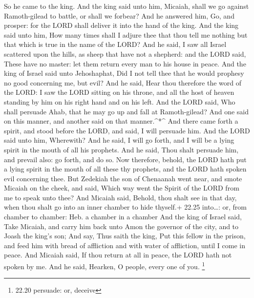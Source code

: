  So he came to the king. And the king said unto him,
Micaiah, shall we go against Ramoth-gilead to battle, or shall we
forbear? And he answered him, Go, and prosper: for the LORD shall
deliver it into the hand of the king.  And the king said
unto him, How many times shall I adjure thee that thou tell me nothing
but that which is true in the name of the LORD?  And he
said, I saw all Israel scattered upon the hills, as sheep that have not
a shepherd: and the LORD said, These have no master: let them return
every man to his house in peace.  And the king of Israel
said unto Jehoshaphat, Did I not tell thee that he would prophesy no
good concerning me, but evil?  And he said, Hear thou
therefore the word of the LORD: I saw the LORD sitting on his throne,
and all the host of heaven standing by him on his right hand and on his
left.  And the LORD said, Who shall persuade Ahab, that he
may go up and fall at Ramoth-gilead? And one said on this manner, and
another said on that manner.\^{}*\^{}  And there came forth
a spirit, and stood before the LORD, and said, I will persuade him.
 And the LORD said unto him, Wherewith? And he said, I will
go forth, and I will be a lying spirit in the mouth of all his prophets.
And he said, Thou shalt persuade him, and prevail also: go forth, and do
so.  Now therefore, behold, the LORD hath put a lying
spirit in the mouth of all these thy prophets, and the LORD hath spoken
evil concerning thee.  But Zedekiah the son of Chenaanah
went near, and smote Micaiah on the cheek, and said, Which way went the
Spirit of the LORD from me to speak unto thee?  And Micaiah
said, Behold, thou shalt see in that day, when thou shalt go into an
inner chamber to hide thyself.+ 22.25 into\ldots: or, from chamber to
chamber: Heb. a chamber in a chamber  And the king of
Israel said, Take Micaiah, and carry him back unto Amon the governor of
the city, and to Joash the king's son;  And say, Thus saith
the king, Put this fellow in the prison, and feed him with bread of
affliction and with water of affliction, until I come in peace.
 And Micaiah said, If thou return at all in peace, the LORD
hath not spoken by me. And he said, Hearken, O people, every one of you.
\footnote{22.20 persuade: or, deceive}

